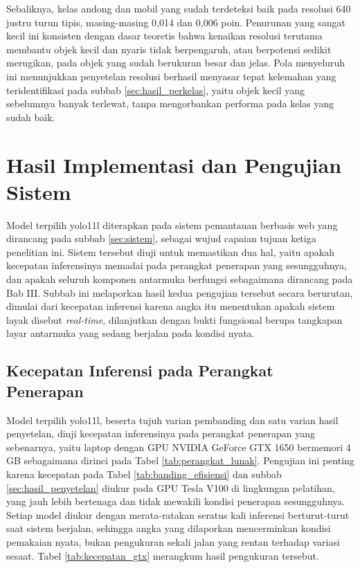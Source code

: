 Sebaliknya, kelas andong dan mobil yang sudah terdeteksi baik pada resolusi 640 justru turun 
tipis, masing-masing 0,014 dan 0,006 poin. Penurunan yang sangat kecil ini konsisten dengan 
dasar teoretis bahwa kenaikan resolusi terutama membantu objek kecil dan nyaris tidak 
berpengaruh, atau berpotensi sedikit merugikan, pada objek yang sudah berukuran besar dan 
jelas. Pola menyeluruh ini menunjukkan penyetelan resolusi berhasil menyasar tepat 
kelemahan yang teridentifikasi pada subbab \ref{sec:hasil_perkelas}, yaitu objek kecil yang 
sebelumnya banyak terlewat, tanpa mengorbankan performa pada kelas yang sudah baik.

\section{Hasil Implementasi dan Pengujian Sistem}
\label{sec:hasil_sistem}

Model terpilih yolo11l diterapkan pada sistem pemantauan berbasis web yang dirancang pada 
subbab \ref{sec:sistem}, sebagai wujud capaian tujuan ketiga penelitian ini. Sistem tersebut 
diuji untuk memastikan dua hal, yaitu apakah kecepatan inferensinya memadai pada perangkat 
penerapan yang sesungguhnya, dan apakah seluruh komponen antarmuka berfungsi sebagaimana 
dirancang pada Bab III. Subbab ini melaporkan hasil kedua pengujian tersebut secara 
berurutan, dimulai dari kecepatan inferensi karena angka itu menentukan apakah sistem layak 
disebut \textit{real-time}, dilanjutkan dengan bukti fungsional berupa tangkapan layar 
antarmuka yang sedang berjalan pada kondisi nyata.

\subsection{Kecepatan Inferensi pada Perangkat Penerapan}
\label{sec:kecepatan_gtx}

Model terpilih yolo11l, beserta tujuh varian pembanding dan satu varian hasil penyetelan, 
diuji kecepatan inferensinya pada perangkat penerapan yang sebenarnya, yaitu laptop dengan 
GPU NVIDIA GeForce GTX 1650 bermemori 4 GB sebagaimana dirinci pada Tabel 
\ref{tab:perangkat_lunak}. Pengujian ini penting karena kecepatan pada Tabel 
\ref{tab:banding_efisiensi} dan subbab \ref{sec:hasil_penyetelan} diukur pada GPU Tesla 
V100 di lingkungan pelatihan, yang jauh lebih bertenaga dan tidak mewakili kondisi penerapan 
sesungguhnya. Setiap model diukur dengan merata-ratakan seratus kali inferensi berturut-turut 
saat sistem berjalan, sehingga angka yang dilaporkan mencerminkan kondisi pemakaian nyata, 
bukan pengukuran sekali jalan yang rentan terhadap variasi sesaat. Tabel 
\ref{tab:kecepatan_gtx} merangkum hasil pengukuran tersebut.

